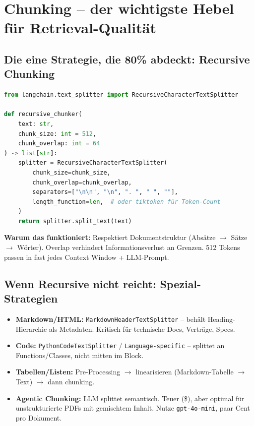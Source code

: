 \section{Chunking -- der wichtigste Hebel für Retrieval-Qualität}


\subsection{Die eine Strategie, die 80\% abdeckt: Recursive Chunking}

\begin{lstlisting}[language=Python, caption={Recursive Chunking -- Startpunkt, der funktioniert}]
from langchain.text_splitter import RecursiveCharacterTextSplitter

def recursive_chunker(
    text: str,
    chunk_size: int = 512,
    chunk_overlap: int = 64
) -> list[str]:
    splitter = RecursiveCharacterTextSplitter(
        chunk_size=chunk_size,
        chunk_overlap=chunk_overlap,
        separators=["\n\n", "\n", ". ", " ", ""],
        length_function=len,  # oder tiktoken für Token-Count
    )
    return splitter.split_text(text)
\end{lstlisting}

\textbf{Warum das funktioniert:} Respektiert Dokumentstruktur (Absätze $\to$ Sätze $\to$ Wörter). Overlap verhindert Informationsverlust an Grenzen. 512 Tokens passen in fast jedes Context Window + LLM-Prompt.

\subsection{Wenn Recursive nicht reicht: Spezial-Strategien}

\begin{itemize}

    \item \textbf{Markdown/HTML:} \texttt{MarkdownHeaderTextSplitter} -- behält Heading-Hierarchie als Metadaten. Kritisch für technische Docs, Verträge, Specs.
    \item \textbf{Code:} \texttt{PythonCodeTextSplitter} / \texttt{Language-specific} -- splittet an Functions/Classes, nicht mitten im Block.
    \item \textbf{Tabellen/Listen:} Pre-Processing $\to$ linearisieren (Markdown-Tabelle $\to$ Text) $\to$ dann chunking.
    \item \textbf{Agentic Chunking:} LLM splittet semantisch. Teuer (\$), aber optimal für unstrukturierte PDFs mit gemischtem Inhalt. Nutze \texttt{gpt-4o-mini}, paar Cent pro Dokument.
\end{itemize}




